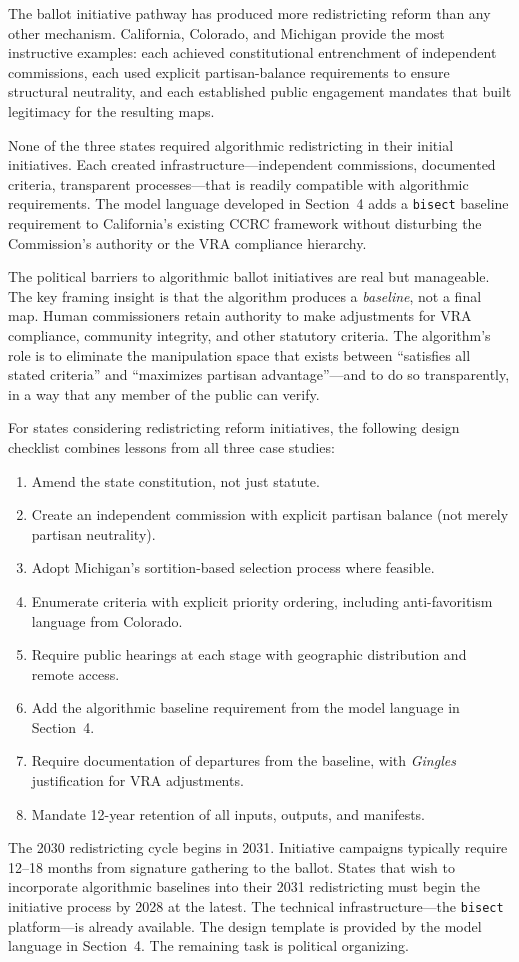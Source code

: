 The ballot initiative pathway has produced more redistricting reform than any other mechanism. California, Colorado, and Michigan provide the most instructive examples: each achieved constitutional entrenchment of independent commissions, each used explicit partisan-balance requirements to ensure structural neutrality, and each established public engagement mandates that built legitimacy for the resulting maps.

None of the three states required algorithmic redistricting in their initial initiatives. Each created infrastructure---independent commissions, documented criteria, transparent processes---that is readily compatible with algorithmic requirements. The model language developed in Section~4 adds a \texttt{bisect} baseline requirement to California's existing CCRC framework without disturbing the Commission's authority or the VRA compliance hierarchy.

The political barriers to algorithmic ballot initiatives are real but manageable. The key framing insight is that the algorithm produces a \emph{baseline}, not a final map. Human commissioners retain authority to make adjustments for VRA compliance, community integrity, and other statutory criteria. The algorithm's role is to eliminate the manipulation space that exists between ``satisfies all stated criteria'' and ``maximizes partisan advantage''---and to do so transparently, in a way that any member of the public can verify.

For states considering redistricting reform initiatives, the following design checklist combines lessons from all three case studies:

\begin{enumerate}
  \item Amend the state constitution, not just statute.
  \item Create an independent commission with explicit partisan balance (not merely partisan neutrality).
  \item Adopt Michigan's sortition-based selection process where feasible.
  \item Enumerate criteria with explicit priority ordering, including anti-favoritism language from Colorado.
  \item Require public hearings at each stage with geographic distribution and remote access.
  \item Add the algorithmic baseline requirement from the model language in Section~4.
  \item Require documentation of departures from the baseline, with \textit{Gingles} justification for VRA adjustments.
  \item Mandate 12-year retention of all inputs, outputs, and manifests.
\end{enumerate}

The 2030 redistricting cycle begins in 2031. Initiative campaigns typically require 12--18 months from signature gathering to the ballot. States that wish to incorporate algorithmic baselines into their 2031 redistricting must begin the initiative process by 2028 at the latest. The technical infrastructure---the \texttt{bisect} platform---is already available. The design template is provided by the model language in Section~4. The remaining task is political organizing.
